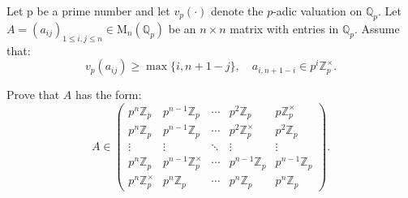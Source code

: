 \begin{exercise}
\label{algebra:2018:5}
Let p be a prime number and let $v_p(\cdot)$ denote the $p$-adic valuation on $\mathbb{Q}_p$. Let $A = (a_{ij})_{1 \leq i, j \leq n} \in \mathrm{M}_n(\mathbb{Q}_p)$ be an $n \times n$ matrix with entries in $\mathbb{Q}_p$. Assume that:
\[v_p(a_{ij}) \geq \max\{i, n+1-j\}, \quad a_{i,n+1-i} \in p^i \mathbb{Z}_p^\times.\]

Prove that $A$ has the form:
\[A \in \begin{pmatrix} p^n\mathbb{Z}_p & p^{n-1}\mathbb{Z}_p & \cdots & p^2\mathbb{Z}_p & p\mathbb{Z}_p^\times \\ p^n\mathbb{Z}_p & p^{n-1}\mathbb{Z}_p & \cdots & p^2\mathbb{Z}_p^\times & p^2\mathbb{Z}_p \\ \vdots & \vdots & \ddots & \vdots & \vdots \\ p^n\mathbb{Z}_p & p^{n-1}\mathbb{Z}_p^\times & \cdots & p^{n-1}\mathbb{Z}_p & p^{n-1}\mathbb{Z}_p \\ p^n\mathbb{Z}_p^\times & p^n\mathbb{Z}_p & \cdots & p^n\mathbb{Z}_p & p^n\mathbb{Z}_p \end{pmatrix}.\]
\end{exercise}
